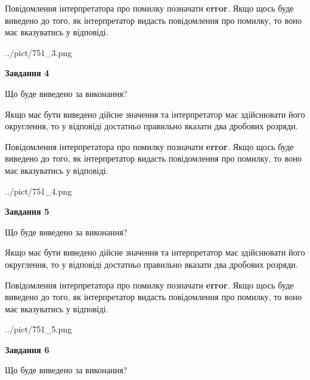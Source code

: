 \documentclass[12pt, ukrainian]{article}
\begin{document}
{\begin {Large}
Повідомлення інтерпретатора про помилку позначати \textbf{error}.
Якщо щось буде виведено до того, як інтерпретатор видасть повідомлення про помилку, 
то воно має вказуватись у відповіді. \par

\begin{center}
	{../pict/751_3.png}
\end{center}
\newpage

{\begin {center}\textbf{Завдання 4}\end {center}}\par
Що буде виведено за виконання? \par

Якщо має бути виведено дійсне значення та інтерпретатор має здійснювати його округлення, 
то у відповіді достатньо правильно вказати два дробових розряди.

Повідомлення інтерпретатора про помилку позначати \textbf{error}.
Якщо щось буде виведено до того, як інтерпретатор видасть повідомлення про помилку, 
то воно має вказуватись у відповіді. \par

\begin{center}
	{../pict/751_4.png}
\end{center}
\newpage

{\begin {center}\textbf{Завдання 5}\end {center}}\par
Що буде виведено за виконання? \par

Якщо має бути виведено дійсне значення та інтерпретатор має здійснювати його округлення, 
то у відповіді достатньо правильно вказати два дробових розряди.

Повідомлення інтерпретатора про помилку позначати \textbf{error}.
Якщо щось буде виведено до того, як інтерпретатор видасть повідомлення про помилку, 
то воно має вказуватись у відповіді. \par

\begin{center}
	{../pict/751_5.png}
\end{center}
\newpage

{\begin {center}\textbf{Завдання 6}\end {center}}\par
Що буде виведено за виконання? \par


\end{Large}}
\end{document}
